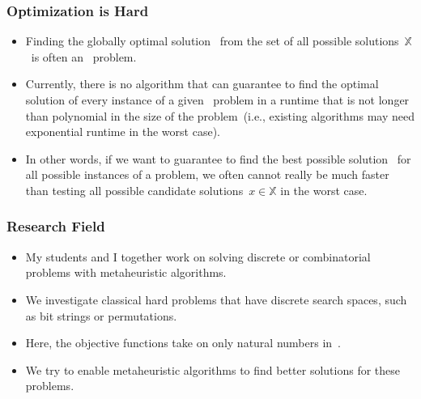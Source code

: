 \documentclass[aspectratio=169,mathserif,notheorems]{beamer}%
\gdef\searchSpace{\ensuremath{\mathbb{X}}}%
\gdef\sespel{\ensuremath{x}}%
\begin{document}
\begin{frame}[t]%
\frametitle{Optimization is Hard}%
\begin{itemize}%
%
\item Finding the globally optimal solution~\globalOptimumOf{\sespel} from the set of all possible solutions~\searchSpace\ is often an \npHard\ problem.%
%
\item<2-> Currently, there is no algorithm that can \alert{guarantee} to find the optimal solution of \alert{every instance} of a given \npHard\ problem in a runtime that is not longer than polynomial in the size of the problem~(i.e., existing algorithms may need exponential runtime in the \alert{worst case}).%
%
\item<4-> In other words, if we want to guarantee to find the best possible solution~\globalOptimumOf{\sespel} for all possible instances of a problem, we often cannot really be much faster than testing all possible candidate solutions~$\sespel\in\searchSpace$ in the \alert{worst case}.%
%
\end{itemize}%
%
%
%
\end{frame}%
%
%
%
%
%
%
\begin{frame}%
\frametitle{Research Field}%
\begin{itemize}%
%
\item My students and I together work on solving discrete or combinatorial problems with \gls{metaheuristic} algorithms.%
%
\item<2-> We investigate classical hard problems that have discrete search spaces, such as bit strings or permutations.%
%
\item<3-> Here, the objective functions take on only natural numbers in~\naturalNumbersZ.%
%
\item<4-> We try to enable \gls{metaheuristic} algorithms to find better solutions for these problems.%
%
\end{itemize}%
\end{frame}%
%
%
\end{document}
